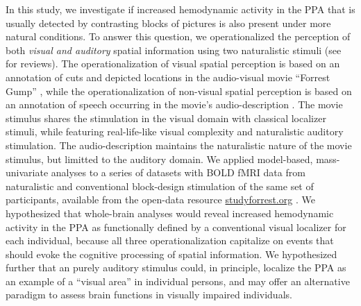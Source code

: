 \documentclass[english]{article}
\begin{document}
In this study, we investigate if increased hemodynamic activity in the PPA that
is usually detected by contrasting blocks of pictures is also present under more
natural conditions.
To answer this question, we operationalized the perception of both \textit{visual and
auditory} spatial information using two naturalistic stimuli (see
\citep{hamilton2018revolution, hasson2008neurocinematics,
sonkusare2019naturalistic} for reviews).
The operationalization of visual spatial perception is based on an annotation of
cuts and depicted locations in the audio-visual movie ``Forrest Gump''
\citep{haeusler2016cutanno}, while
the operationalization of non-visual spatial perception is based on an
annotation of speech occurring in the movie's audio-description
\citep{hausler2021studyforrest}.
The movie stimulus shares the stimulation in the visual domain with classical
localizer stimuli, while featuring real-life-like visual complexity and naturalistic
auditory stimulation. The audio-description maintains the naturalistic nature of
the movie stimulus, but limitted to the auditory domain.
We applied model-based, mass-univariate analyses to a series of datasets with
BOLD fMRI data from naturalistic and conventional block-design stimulation of
the same set of participants, available from the open-data resource
\href{http://www.studyforrest.org}{studyforrest.org}
\citep{hanke2016simultaneous, hanke2014audiomovie, sengupta2016extension}.
We hypothesized that whole-brain analyses would reveal increased hemodynamic
activity in the PPA as functionally defined by a conventional visual localizer
for each individual, because all three operationalization capitalize on events
that should evoke the cognitive processing of spatial information.
We hypothesized further that an purely auditory stimulus could, in principle,
localize the PPA as an example of a ``visual area'' in individual persons,
and may offer an alternative paradigm to assess brain functions in visually
impaired individuals.

\end{document}
